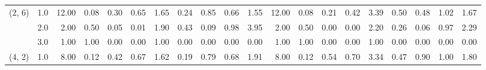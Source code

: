 \begin{tabular}{llrrrrrrrrrrrrrrrrrr}
(2, 6) & 1.0 &              12.00 &                     0.08 &                                 0.30 &                             0.65 &                           1.65 &                                               0.24 &                                            0.85 &                                            0.66 &                                        1.55 &              12.00 &                     0.08 &                                 0.21 &                             0.42 &                           3.39 &                                               0.50 &                                            0.48 &                                            1.02 &                                        1.67 \\
       & 2.0 &               2.00 &                     0.50 &                                 0.05 &                             0.01 &                           1.90 &                                               0.43 &                                            0.09 &                                            0.98 &                                        3.95 &               2.00 &                     0.50 &                                 0.00 &                             0.00 &                           2.20 &                                               0.26 &                                            0.06 &                                            0.97 &                                        2.29 \\
       & 3.0 &               1.00 &                     1.00 &                                 0.00 &                             0.00 &                           1.00 &                                               0.00 &                                            0.00 &                                            0.00 &                                        0.00 &               1.00 &                     1.00 &                                 0.00 &                             0.00 &                           1.00 &                                               0.00 &                                            0.00 &                                            0.00 &                                        0.00 \\
(4, 2) & 1.0 &               8.00 &                     0.12 &                                 0.42 &                             0.67 &                           1.62 &                                               0.19 &                                            0.79 &                                            0.68 &                                        1.91 &               8.00 &                     0.12 &                                 0.54 &                             0.70 &                           3.34 &                                               0.47 &                                            0.90 &                                            1.00 &                                        1.80 \\

\end{tabular}
